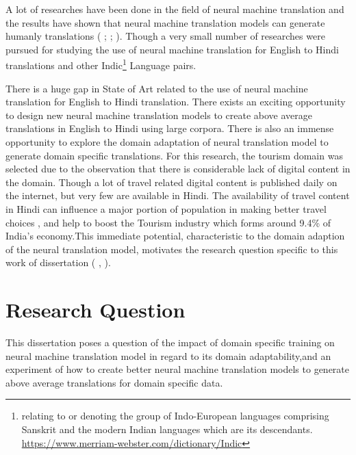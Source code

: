 A lot of researches have been done in the field of neural machine translation and the results have shown that neural machine translation models can generate humanly translations ( \citeauthor{NIPS2014_5346} \citeyear{NIPS2014_5346}; \citeauthor{DBLP:journals/corr/BahdanauCB14} \citeyear{DBLP:journals/corr/BahdanauCB14}; \citeauthor{45610} \citeyear{45610}). Though a very small number of researches were pursued for studying the use of neural machine translation for English to Hindi translations and other Indic\footnote{relating to or denoting the group of Indo-European languages comprising Sanskrit and the modern Indian languages which are its descendants. {\url{https://www.merriam-webster.com/dictionary/Indic}}} Language pairs. 

There is a huge gap in State of Art related to the use of neural machine translation for English to Hindi translation. There exists an exciting opportunity to design new neural machine translation models to create above average translations in English to Hindi using large corpora. There is also an immense opportunity to explore the domain adaptation of neural translation model to generate domain specific translations. For this research, the tourism domain was selected due to the observation that there is considerable lack of digital content in the domain. Though a lot of travel related digital content is published daily on the internet, but very few are available in Hindi. The availability of travel content in Hindi can influence a major portion of population in making better travel choices , and help to boost the Tourism industry which forms around 9.4\% of India's economy.This immediate potential, characteristic to the domain adaption of the neural translation model, motivates the research question specific to this work of dissertation (\citeauthor{wiki:tourism} , \citeyear{wiki:tourism}).

\section{Research Question}
This dissertation poses a question of the impact of domain specific training on neural machine translation model in regard to its domain adaptability,and an experiment of how to create better neural machine translation models to generate above average translations for domain specific data.

